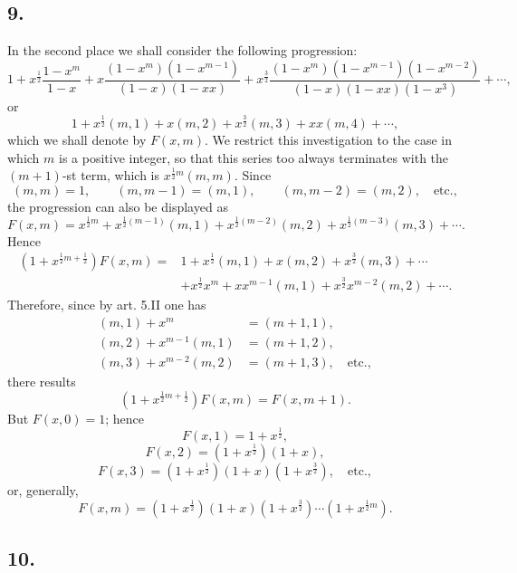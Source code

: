 \documentclass[12pt]{article}
\begin{document}
\subsection*{9.}

In the second place we shall consider the following progression:
\[
1+x^{\frac12}\frac{1-x^m}{1-x}
+x\frac{(1-x^m)(1-x^{m-1})}{(1-x)(1-xx)}
+x^{\frac32}\frac{(1-x^m)(1-x^{m-1})(1-x^{m-2})}{(1-x)(1-xx)(1-x^3)}
+\cdots,
\]
or
\[
1+x^{\frac12}(m,1)+x(m,2)+x^{\frac32}(m,3)+xx(m,4)+\cdots,
\]
which we shall denote by $F(x,m)$. We restrict this investigation to the case in which $m$ is a positive integer, so that this series too always terminates with the $(m+1)$-st term, which is $x^{\frac12m}(m,m)$. Since
\[
(m,m)=1,\qquad (m,m-1)=(m,1),\qquad (m,m-2)=(m,2),\quad\text{etc.},
\]
the progression can also be displayed as
\[
F(x,m)=x^{\frac12m}+x^{\frac12(m-1)}(m,1)+x^{\frac12(m-2)}(m,2)+x^{\frac12(m-3)}(m,3)+\cdots.
\]
Hence
\[
\begin{aligned}
(1+x^{\frac12m+\frac12})F(x,m)
={}&1+x^{\frac12}(m,1)+x(m,2)+x^{\frac32}(m,3)+\cdots\\
&+x^{\frac12}x^m+x x^{m-1}(m,1)+x^{\frac32}x^{m-2}(m,2)+\cdots.
\end{aligned}
\]
Therefore, since by art. 5.II one has
\[
\begin{aligned}
(m,1)+x^m&=(m+1,1),\\
(m,2)+x^{m-1}(m,1)&=(m+1,2),\\
(m,3)+x^{m-2}(m,2)&=(m+1,3),\quad\text{etc.},
\end{aligned}
\]
there results
\[
(1+x^{\frac12m+\frac12})F(x,m)=F(x,m+1). \tag{3}
\]
But $F(x,0)=1$; hence
\[
F(x,1)=1+x^{\frac12},
\]
\[
F(x,2)=(1+x^{\frac12})(1+x),
\]
\[
F(x,3)=(1+x^{\frac12})(1+x)(1+x^{\frac32}),\quad\text{etc.},
\]
or, generally,
\[
F(x,m)=(1+x^{\frac12})(1+x)(1+x^{\frac32})\cdots(1+x^{\frac12m}). \tag{4}
\]

\subsection*{10.}
\end{document}
